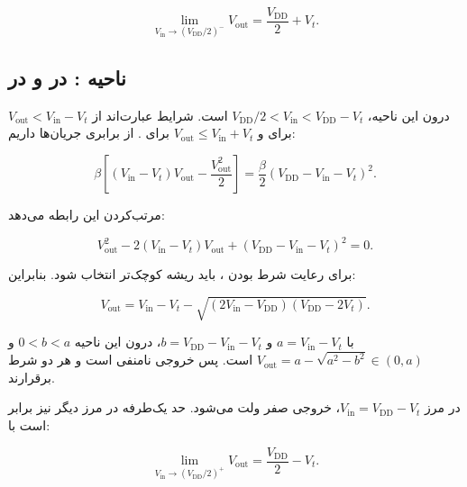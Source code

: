 \nopagebreak[3]
\begin{equation}\label{eq:ex16-7}
\lim_{V_{\mathrm{in}}\to(V_{\mathrm{DD}}/2)^-}V_{\mathrm{out}}
=\frac{V_{\mathrm{DD}}}{2}+V_t.
\end{equation}

\subsection*{ناحیه :  در  و  در }

درون این ناحیه، \(V_{\mathrm{DD}}/2<V_{\mathrm{in}}<V_{\mathrm{DD}}-V_t\) است. شرایط  عبارت‌اند از \(V_{\mathrm{out}}<V_{\mathrm{in}}-V_t\) برای  و \(V_{\mathrm{out}}\le V_{\mathrm{in}}+V_t\) برای  \cite[جدول‌های  و ]{weste}. از برابری جریان‌ها داریم:

\nopagebreak[3]
\begin{equation}\label{eq:ex16-8}
\beta\left[(V_{\mathrm{in}}-V_t)V_{\mathrm{out}}
-\frac{V_{\mathrm{out}}^2}{2}\right]
=\frac{\beta}{2}(V_{\mathrm{DD}}-V_{\mathrm{in}}-V_t)^2.
\end{equation}

مرتب‌کردن این رابطه می‌دهد:

\nopagebreak[3]
\begin{equation}\label{eq:ex16-9}
V_{\mathrm{out}}^2-2(V_{\mathrm{in}}-V_t)V_{\mathrm{out}}
+(V_{\mathrm{DD}}-V_{\mathrm{in}}-V_t)^2=0.
\end{equation}

برای رعایت شرط  بودن ، باید ریشه کوچک‌تر انتخاب شود. بنابراین:

\nopagebreak[3]
\begin{equation}\label{eq:ex16-10}
\boxed{
V_{\mathrm{out}}
=V_{\mathrm{in}}-V_t
-\sqrt{(2V_{\mathrm{in}}-V_{\mathrm{DD}})(V_{\mathrm{DD}}-2V_t)}
}.
\end{equation}

با \(a=V_{\mathrm{in}}-V_t\) و \(b=V_{\mathrm{DD}}-V_{\mathrm{in}}-V_t\)، درون این ناحیه \(0<b<a\) و \(V_{\mathrm{out}}=a-\sqrt{a^2-b^2}\in(0,a)\) است. پس خروجی نامنفی است و هر دو شرط  برقرارند.

در مرز \(V_{\mathrm{in}}=V_{\mathrm{DD}}-V_t\)، خروجی صفر ولت می‌شود. حد یک‌طرفه در مرز دیگر نیز برابر است با:

\nopagebreak[3]
\begin{equation}\label{eq:ex16-11}
\lim_{V_{\mathrm{in}}\to(V_{\mathrm{DD}}/2)^+}V_{\mathrm{out}}
=\frac{V_{\mathrm{DD}}}{2}-V_t.
\end{equation}

